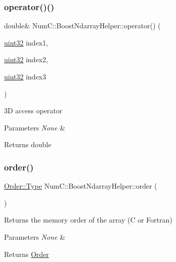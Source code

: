 \subsubsection{\texorpdfstring{operator()()}{operator()()}\hspace{0.1cm}{\footnotesize\ttfamily [3/3]}}
{\footnotesize\ttfamily double\& Num\+C\+::\+Boost\+Ndarray\+Helper\+::operator() (\begin{DoxyParamCaption}\item[{\mbox{\hyperlink{namespace_num_c_ae685802ca6d3035f2b400b081e3953fa}{uint32}}}]{index1,  }\item[{\mbox{\hyperlink{namespace_num_c_ae685802ca6d3035f2b400b081e3953fa}{uint32}}}]{index2,  }\item[{\mbox{\hyperlink{namespace_num_c_ae685802ca6d3035f2b400b081e3953fa}{uint32}}}]{index3 }\end{DoxyParamCaption})\hspace{0.3cm}{\ttfamily [inline]}}

3D access operator


\begin{DoxyParams}{Parameters}
{\em None} & \\
\hline
\end{DoxyParams}
\begin{DoxyReturn}{Returns}
double 
\end{DoxyReturn}
\mbox{\label{class_num_c_1_1_boost_ndarray_helper_a8995280ded1f4c28ff17f4bcbfe0b84e}} 
\subsubsection{\texorpdfstring{order()}{order()}}
{\footnotesize\ttfamily \mbox{\hyperlink{struct_num_c_1_1_order_aec83b68303911af9c219019600b56f23}{Order\+::\+Type}} Num\+C\+::\+Boost\+Ndarray\+Helper\+::order (\begin{DoxyParamCaption}{ }\end{DoxyParamCaption})\hspace{0.3cm}{\ttfamily [inline]}}

Returns the memory order of the array (C or Fortran)


\begin{DoxyParams}{Parameters}
{\em None} & \\
\hline
\end{DoxyParams}
\begin{DoxyReturn}{Returns}
\mbox{\hyperlink{struct_num_c_1_1_order}{Order}} 
\end{DoxyReturn}
\mbox{\label{class_num_c_1_1_boost_ndarray_helper_ad34f79cce34b53db9a368f74fb8d3147}} 
